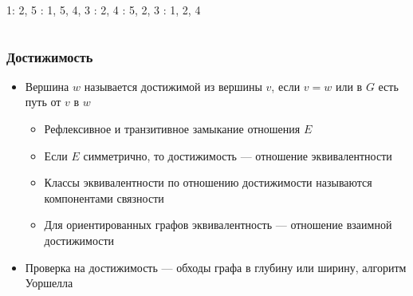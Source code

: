\documentclass[xetex,mathserif,serif]{beamer}
\begin{document}
\begin{frame}
\begin{columns}
\begin{column}{0.35\textwidth}
\begin{center}
                \end{center}
                1: 2, 5 : 1, 5, 4, 3 : 2, 4 : 5, 2, 3 : 1, 2, 4
            \end{column}
        \end{columns}
    \end{frame}

    \begin{frame}
        \frametitle{Достижимость}
        \begin{itemize}
            \item Вершина $w$ называется достижимой из вершины $v$, если $v = w$ или в $G$ есть путь от $v$ в $w$
            \begin{itemize}
                \item Рефлексивное и транзитивное замыкание отношения $E$
                \item Если $E$ симметрично, то достижимость --- отношение эквивалентности
                \item Классы эквивалентности по отношению достижимости называются компонентами связности
                \item Для ориентированных графов эквивалентность --- отношение взаимной достижимости
            \end{itemize}
            \item Проверка на достижимость --- обходы графа в глубину или ширину, алгоритм Уоршелла
        \end{itemize}
    \end{frame}
\end{document}
